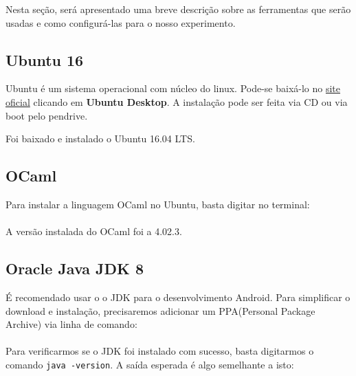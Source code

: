 \documentclass[hidelinks,12pt]{article}
\begin{document}
	Nesta seção, será apresentado uma breve descrição sobre as ferramentas que serão usadas e como configurá-las para o nosso experimento.

	\subsection{Ubuntu 16}
	
	Ubuntu é um sistema operacional com núcleo do linux. Pode-se baixá-lo no  \href{http://www.ubuntu.com/download}{\color{blue}site oficial} clicando em \textbf{Ubuntu Desktop}. A instalação pode ser feita via CD ou via boot pelo pendrive.
	
	Foi baixado e instalado o Ubuntu 16.04 LTS.
	
	\subsection{OCaml}
		
	Para instalar a linguagem OCaml no Ubuntu, basta digitar no terminal:\\
	
	\noindent{}\\
	
	A versão instalada do OCaml foi a 4.02.3.
	
	\subsection{Oracle Java JDK 8}
	
	É recomendado usar o o JDK para o desenvolvimento Android.
	Para simplificar o download e instalação, precisaremos adicionar um PPA(Personal Package Archive) via linha de comando:\\
	
	\noindent{}\\
	
	Para verificarmos se o JDK foi instalado com sucesso, basta digitarmos o comando \texttt{java -version}. A saída esperada é algo semelhante a isto:\\
	
	\noindent{}\\
	
\end{document}
